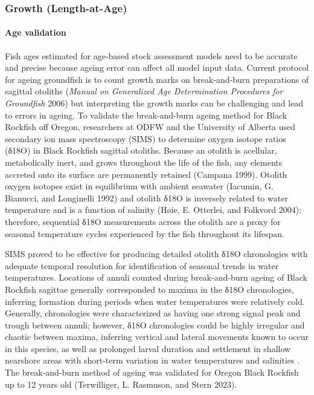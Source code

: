 \documentclass[11pt,
  english,
  letterpaper,
]{article}
\begin{document}
\hypertarget{growth-length-at-age}{%
\subsubsection{Growth (Length-at-Age)}\label{growth-length-at-age}}

\hypertarget{age-validation}{%
\paragraph{Age validation}\label{age-validation}}

Fish ages estimated for age-based stock assessment models need to be accurate and precise because ageing error can affect all model input data. Current protocol for ageing groundfish is to count growth marks on break-and-burn preparations of sagittal otoliths (\emph{Manual on Generalized Age Determination Procedures for Groundfish} 2006) but interpreting the growth marks can be challenging and lead to errors in ageing. To validate the break-and-burn ageing method for Black Rockfish off Oregon, researchers at ODFW and the University of Alberta used secondary ion mass spectroscopy (SIMS) to determine oxygen isotope ratios (δ18O) in Black Rockfish sagittal otoliths. Because an otolith is acellular, metabolically inert, and grows throughout the life of the fish, any elements accreted onto its surface are permanently retained (Campana 1999). Otolith oxygen isotopes exist in equilibrium with ambient seawater (Iacumin, G. Bianucci, and Longinelli 1992) and otolith δ18O is inversely related to water temperature and is a function of salinity (Høie, E. Otterlei, and Folkvord 2004); therefore, sequential δ18O measurements across the otolith are a proxy for seasonal temperature cycles experienced by the fish throughout its lifespan.

SIMS proved to be effective for producing detailed otolith δ18O chronologies with adequate temporal resolution for identification of seasonal trends in water temperatures. Locations of annuli counted during break-and-burn ageing of Black Rockfish sagittae generally corresponded to maxima in the δ18O chronologies, inferring formation during periods when water temperatures were relatively cold. Generally, chronologies were characterized as having one strong signal peak and trough between annuli; however, δ18O chronologies could be highly irregular and chaotic between maxima, inferring vertical and lateral movements known to occur in this species, as well as prolonged larval duration and settlement in shallow nearshore areas with short-term variation in water temperatures and salinities . The break-and-burn method of ageing was validated for Oregon Black Rockfish up to 12 years old (Terwilliger, L. Rasmuson, and Stern 2023).
\end{document}
